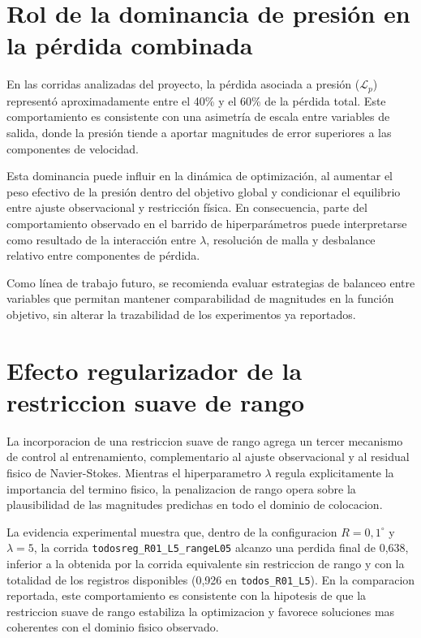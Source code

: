 \section{Rol de la dominancia de presión en la pérdida combinada}

En las corridas analizadas del proyecto, la pérdida asociada a presión ($\mathcal{L}_p$) representó aproximadamente entre el 40\% y el 60\% de la pérdida total. Este comportamiento es consistente con una asimetría de escala entre variables de salida, donde la presión tiende a aportar magnitudes de error superiores a las componentes de velocidad.

Esta dominancia puede influir en la dinámica de optimización, al aumentar el peso efectivo de la presión dentro del objetivo global y condicionar el equilibrio entre ajuste observacional y restricción física. En consecuencia, parte del comportamiento observado en el barrido de hiperparámetros puede interpretarse como resultado de la interacción entre $\lambda$, resolución de malla y desbalance relativo entre componentes de pérdida.

Como línea de trabajo futuro, se recomienda evaluar estrategias de balanceo entre variables que permitan mantener comparabilidad de magnitudes en la función objetivo, sin alterar la trazabilidad de los experimentos ya reportados.

\section{Efecto regularizador de la restriccion suave de rango}

La incorporacion de una restriccion suave de rango agrega un tercer mecanismo de control al entrenamiento, complementario al ajuste observacional y al residual fisico de Navier-Stokes. Mientras el hiperparametro $\lambda$ regula explicitamente la importancia del termino fisico, la penalizacion de rango opera sobre la plausibilidad de las magnitudes predichas en todo el dominio de colocacion.

La evidencia experimental muestra que, dentro de la configuracion $R=0{,}1^{\circ}$ y $\lambda=5$, la corrida \texttt{todosreg\_R01\_L5\_rangeL05} alcanzo una perdida final de 0,638, inferior a la obtenida por la corrida equivalente sin restriccion de rango y con la totalidad de los registros disponibles (0,926 en \texttt{todos\_R01\_L5}). En la comparacion reportada, este comportamiento es consistente con la hipotesis de que la restriccion suave de rango estabiliza la optimizacion y favorece soluciones mas coherentes con el dominio fisico observado.

